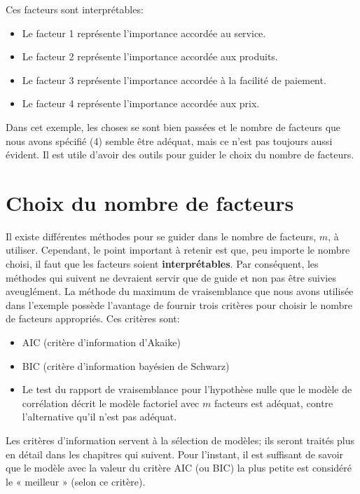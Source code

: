\documentclass[
  11pt,
  letterpaper,
]{book}
\providecommand{\tightlist}{%
  \setlength{\itemsep}{0pt}\setlength{\parskip}{0pt}}
\theoremstyle{definition}
\theoremstyle{definition}
\theoremstyle{definition}
\theoremstyle{remark}
\begin{document}
Ces facteurs sont interprétables:

\begin{itemize}
\tightlist
\item
  Le facteur 1 représente l'importance accordée au service.
\item
  Le facteur 2 représente l'importance accordée aux produits.
\item
  Le facteur 3 représente l'importance accordée à la facilité de paiement.
\item
  Le facteur 4 représente l'importance accordée aux prix.
\end{itemize}

Dans cet exemple, les choses se sont bien passées et le nombre de facteurs que nous avons spécifié (4) semble être adéquat, mais ce n'est pas toujours aussi évident. Il est utile d'avoir des outils pour guider le choix du nombre de facteurs.

\hypertarget{choix-du-nombre-de-facteurs}{%
\section{Choix du nombre de facteurs}\label{choix-du-nombre-de-facteurs}}

Il existe différentes méthodes pour se guider dans le nombre de facteurs, \(m\), à utiliser. Cependant, le point important à retenir est que, peu importe le nombre choisi, il faut que les facteurs soient \textbf{interprétables}. Par conséquent, les méthodes qui
suivent ne devraient servir que de guide et non pas être suivies aveuglément.
La méthode du maximum de vraisemblance que nous avons utilisée dans l'exemple possède l'avantage de fournir trois critères pour choisir le nombre de facteurs appropriés. Ces critères sont:

\begin{itemize}
\tightlist
\item
  AIC (critère d'information d'Akaike)
\item
  BIC (critère d'information bayésien de Schwarz)
\item
  Le test du rapport de vraisemblance pour l'hypothèse nulle que le modèle de corrélation décrit le modèle factoriel avec \(m\) facteurs est adéquat, contre l'alternative qu'il n'est pas adéquat.
\end{itemize}

Les critères d'information servent à la sélection de modèles; ils seront traités plus en détail dans les chapitres qui suivent. Pour l'instant, il est suffisant de savoir que le modèle avec la valeur du critère AIC (ou BIC) la plus petite est considéré le « meilleur » (selon ce critère).
\end{document}
